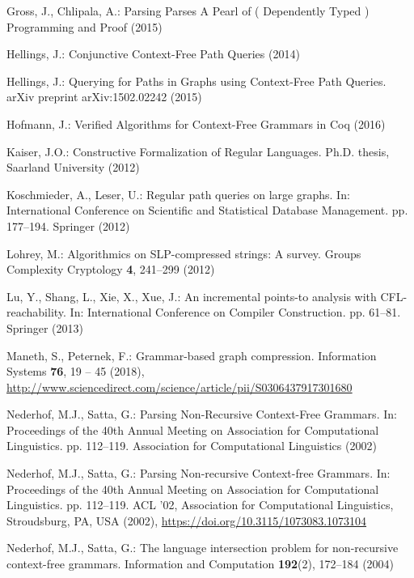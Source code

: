 \documentclass[runningheads]{llncs}
\begin{document}
\begin{thebibliography}{10}
 Gross, J., Chlipala, A.: {Parsing Parses A Pearl of ( Dependently Typed )
   Programming and Proof} (2015)

 Hellings, J.: {Conjunctive Context-Free Path Queries}  (2014)

 Hellings, J.: {Querying for Paths in Graphs using Context-Free Path Queries}.
   arXiv preprint arXiv:1502.02242  (2015)

 Hofmann, J.: {Verified Algorithms for Context-Free Grammars in Coq} (2016)

 Kaiser, J.O.: {Constructive Formalization of Regular Languages}. Ph.D. thesis,
   Saarland University (2012)

 Koschmieder, A., Leser, U.: {Regular path queries on large graphs}. In:
   {International Conference on Scientific and Statistical Database Management}.
   pp. 177--194. Springer (2012)

 Lohrey, M.: {Algorithmics on SLP-compressed strings: A survey}. Groups
   Complexity Cryptology  \textbf{4},  241--299 (2012)

 Lu, Y., Shang, L., Xie, X., Xue, J.: {An incremental points-to analysis with
   CFL-reachability}. In: International Conference on Compiler Construction. pp.
   61--81. Springer (2013)

 Maneth, S., Peternek, F.: {Grammar-based graph compression}. Information
   Systems  \textbf{76},  19 -- 45 (2018),
   \url{http://www.sciencedirect.com/science/article/pii/S0306437917301680}

 Nederhof, M.J., Satta, G.: {Parsing Non-Recursive Context-Free Grammars}. In:
   Proceedings of the 40th Annual Meeting on Association for Computational
   Linguistics. pp. 112--119. Association for Computational Linguistics (2002)

 Nederhof, M.J., Satta, G.: {Parsing Non-recursive Context-free Grammars}. In:
   {Proceedings of the 40th Annual Meeting on Association for Computational
   Linguistics}. pp. 112--119. ACL '02, Association for Computational
   Linguistics, Stroudsburg, PA, USA (2002),
   \url{https://doi.org/10.3115/1073083.1073104}

 Nederhof, M.J., Satta, G.: {The language intersection problem for non-recursive
   context-free grammars}. Information and Computation  \textbf{192}(2),
   172--184 (2004)


\end{thebibliography}
\end{document}
